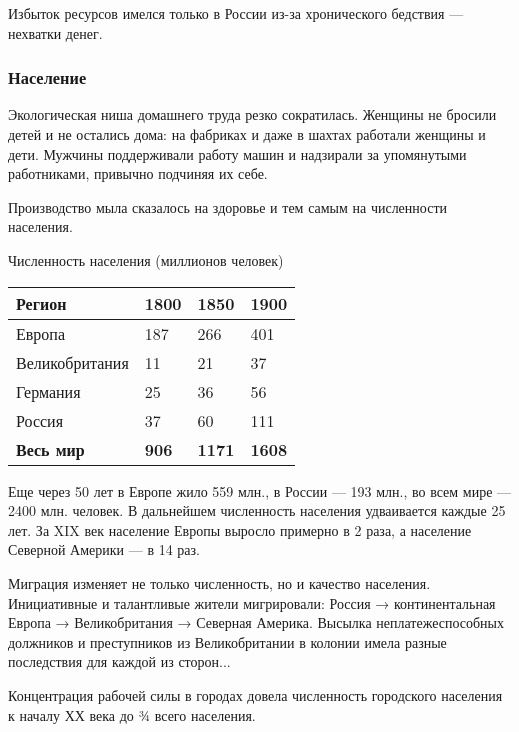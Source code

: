 Избыток ресурсов имелся только в России из-за хронического бедствия — нехватки денег.

\subsubsection[Население ]{Население}

Экологическая ниша домашнего труда резко сократилась. Женщины не бросили детей и не остались дома: на фабриках и даже в
шахтах работали женщины и дети. Мужчины поддерживали работу машин и надзирали за упомянутыми работниками, привычно
подчиняя их себе.


Производство мыла сказалось на здоровье и тем самым на численности населения.

Численность населения (миллионов человек)
\par

\begin{center}
\tablefirsthead{}
\tablehead{}
\tabletail{}
\tablelasttail{}
\begin{supertabular}{|m{1.1538599in}|m{0.37685984in}|m{0.37685984in}|m{0.38375986in}|}
\hline
\bfseries Регион &
\bfseries 1800 &
\bfseries 1850 &
\bfseries 1900\\\hline
 Европа &
 187 &
 266 &
 401\\\hline
 Великобритания &
 11 &
 21 &
 37\\\hline
 Германия &
 25 &
 36 &
 56\\\hline
 Россия &
 37 &
 60 &
 111\\\hline
\bfseries Весь мир &
\bfseries 906 &
\bfseries 1171 &
\bfseries 1608\\\hline
\end{supertabular}
\end{center}

Еще через 50 лет в Европе жило 559 млн., в России — 193 млн., во всем мире — 2400 млн. человек. В дальнейшем численность
населения удваивается каждые 25 лет. За \foreignlanguage{english}{XIX} век население Европы выросло примерно в 2 раза,
а население Северной Америки — в 14 раз.


Миграция изменяет не только численность, но и качество населения. Инициативные и талантливые жители мигрировали: Россия
→ континентальная Европа → Великобритания → Северная Америка. Высылка неплатежеспособных должников и преступников из
Великобритании в колонии имела разные последствия для каждой из сторон...


Концентрация рабочей силы в городах довела численность городского населения к началу ХХ века до ¾ всего населения.


